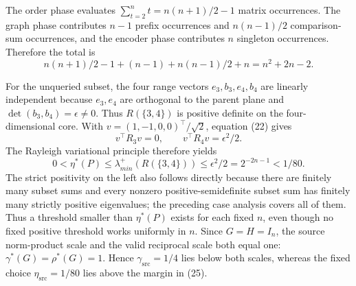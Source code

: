 The order phase evaluates \(\sum_{t=2}^nt=n(n+1)/2-1\) matrix occurrences.  The graph phase contributes \(n-1\) prefix occurrences and \(n(n-1)/2\) comparison-sum occurrences, and the encoder phase contributes \(n\) singleton occurrences.  Therefore the total is
\[
 n(n+1)/2-1+(n-1)+n(n-1)/2+n=n^2+2n-2.
 \tag{24}
\]

For the unqueried subset, the four range vectors \(e_3,b_3,e_4,b_4\) are linearly independent because \(e_3,e_4\) are orthogonal to the parent plane and \(\det(b_3,b_4)=\epsilon\ne0\).  Thus \(R(\{3,4\})\) is positive definite on the four-dimensional core.  With \(v=(1,-1,0,0)^{\top}/\sqrt2\), equation (22) gives
\[
 v^{\top}R_3v=0,
 \qquad
 v^{\top}R_4v=\epsilon^2/2.
\]
The Rayleigh variational principle therefore yields
\[
 0<\eta^{\ast}(P)
 \le\lambda_{min}^{+}(R(\{3,4\}))
 \le\epsilon^2/2=2^{-2n-1}<1/80.
 \tag{25}
\]
The strict positivity on the left also follows directly because there are finitely many subset sums and every nonzero positive-semidefinite subset sum has finitely many strictly positive eigenvalues; the preceding case analysis covers all of them.  Thus a threshold smaller than \(\eta^{\ast}(P)\) exists for each fixed \(n\), even though no fixed positive threshold works uniformly in \(n\).  Since \(G=H=I_n\), the source norm-product scale and the valid reciprocal scale both equal one: \(\gamma^{\ast}(G)=\rho^{\ast}(G)=1\).  Hence \(\gamma_{\mathrm{src}}=1/4\) lies below both scales, whereas the fixed choice \(\eta_{\mathrm{src}}=1/80\) lies above the margin in (25).

